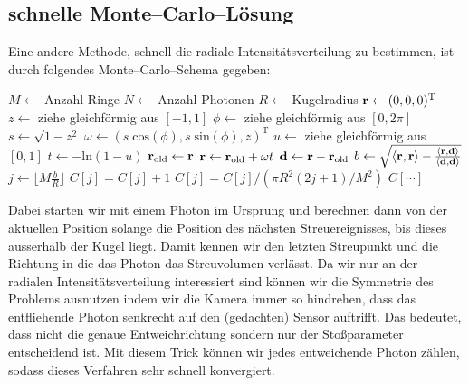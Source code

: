 	\subsection{schnelle Monte--Carlo--Lösung}
	Eine andere Methode, schnell die radiale Intensitätsverteilung zu bestimmen, ist durch folgendes Monte--Carlo--Schema gegeben:
	\begin{algorithmic}
		\STATE $M\leftarrow$ Anzahl Ringe
		\STATE $N\leftarrow$ Anzahl Photonen
		\STATE $R\leftarrow$ Kugelradius
			\STATE $\mathbf{r}\leftarrow (0,0,0)^\text{T}$
			\REPEAT
				\STATE{}
				\STATE $z\leftarrow$ ziehe gleichförmig aus $[-1,1]$
				\STATE $\phi\leftarrow$ ziehe gleichförmig aus $[0,2\pi]$
				\STATE $s\leftarrow\sqrt{1-z^2}$
				\STATE $\omega\leftarrow (s\;\text{cos}(\phi),s\;\text{sin}(\phi),z)^\text{T}$
				\STATE{}
				\STATE $u\leftarrow$ ziehe gleichförmig aus $[0,1]$
				\STATE $t\leftarrow -\text{ln}(1-u)$
				\STATE $\mathbf{r}_\text{old}\leftarrow\mathbf{r}$
				\STATE $\mathbf{r}\leftarrow\mathbf{r}_\text{old}+\omega t$
			\STATE{}
			\STATE $\mathbf{d}\leftarrow\mathbf{r}-\mathbf{r}_\text{old}$
			\STATE $b\leftarrow\sqrt{\langle\mathbf{r},\mathbf{r}\rangle-\frac{\langle\mathbf{r},\mathbf{d}\rangle}{\langle\mathbf{d},\mathbf{d}\rangle}}$
			\STATE $j\leftarrow\lfloor M\frac{b}{R}\rfloor$
			\STATE $C[j]=C[j]+1$
		\ENDFOR
			\STATE $C[j]=C[j]/(\pi R^2(2j+1)/M^2)$
		\ENDFOR
		\RETURN $C[\cdots]$
	\end{algorithmic}
	Dabei starten wir mit einem Photon im Ursprung und berechnen dann von der aktuellen Position solange die Position des nächsten Streuereignisses, bis dieses ausserhalb der Kugel liegt. Damit kennen wir den letzten Streupunkt und die Richtung in die das Photon das Streuvolumen verlässt. Da wir nur an der radialen Intensitätsverteilung interessiert sind können wir die Symmetrie des Problems ausnutzen indem wir die Kamera immer so hindrehen, dass das entfliehende Photon senkrecht auf den (gedachten) Sensor auftrifft. Das bedeutet, dass nicht die genaue Entweichrichtung sondern nur der Stoßparameter entscheidend ist. Mit diesem Trick können wir jedes entweichende Photon zählen, sodass dieses Verfahren sehr schnell konvergiert.
	
	
